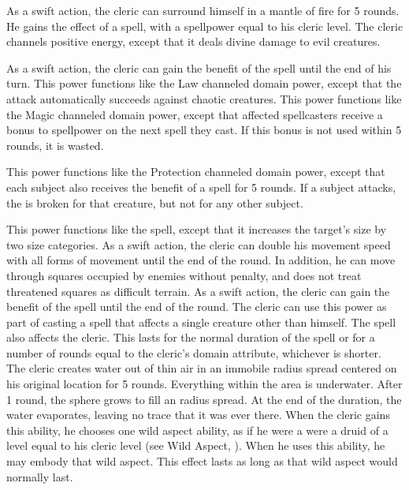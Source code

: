 As a swift action, the cleric can surround himself in a mantle of fire for 5 rounds.
He gains the effect of a  spell, with a spellpower equal to his cleric level.
The cleric channels positive energy, except that it deals divine damage to evil creatures.

 As a swift action, the cleric can gain the benefit of the 
spell until the end of his turn.
This power functions like the Law channeled domain power, except that the attack automatically succeeds against chaotic creatures.
This power functions like the Magic channeled domain power, except that affected spellcasters receive a  bonus to spellpower on the next spell they cast.
If this bonus is not used within 5 rounds, it is wasted.

 This power functions like the Protection channeled domain power, except that each subject also receives the benefit of a 
spell for 5 rounds.
If a subject attacks, the  is broken for that creature, but not for any other subject.

This power functions like the  spell, except that it increases the target's size by two size categories.
As a swift action, the cleric can double his movement speed with all forms of movement until the end of the round.
In addition, he can move through squares occupied by enemies without penalty, and does not treat threatened squares as difficult terrain.
 As a swift action, the cleric can gain the benefit of the 
spell until the end of the round.
The cleric can use this power as part of casting a spell that affects a single creature other than himself.
The spell also affects the cleric.
This lasts for the normal duration of the spell or for a number of rounds equal to the cleric's domain attribute, whichever is shorter.
The cleric creates water out of thin air in an immobile \areamed radius spread centered on his original location for 5 rounds.
Everything within the area is underwater.
After 1 round, the sphere grows to fill an \arealarge radius spread.
At the end of the duration, the water evaporates, leaving no trace that it was ever there.
When the cleric gains this ability, he chooses one wild aspect ability, as if he were a were a druid of a level equal to his cleric level (see Wild Aspect, ).
When he uses this ability, he may embody that wild aspect.
This effect lasts as long as that wild aspect would normally last.

